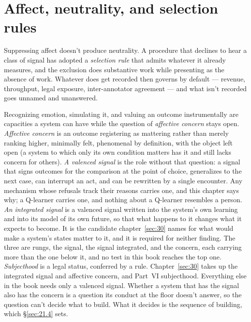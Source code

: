 \section{Affect, neutrality, and selection rules}
\label{sec:21.2}
Suppressing affect doesn't produce neutrality. A procedure that declines to hear a class of signal has adopted a \emph{selection rule} that admits whatever it already measures, and the exclusion does substantive work while presenting as the absence of work. Whatever does get recorded then governs by default — revenue, throughput, legal exposure, inter-annotator agreement — and what isn't recorded goes unnamed and unanswered.

Recognizing emotion, simulating it, and valuing an outcome instrumentally are capacities a system can have while the question of \emph{affective concern} stays open.
\emph{Affective concern} is an outcome registering as mattering rather than merely ranking higher, minimally felt, phenomenal by definition, with the object left open (a system to which only its own condition matters has it and still lacks concern for others).
\emph{A valenced signal} is the role without that question: a signal that signs outcomes for the comparison at the point of choice, generalizes to the next case, can interrupt an act, and can be rewritten by a single encounter. Any mechanism whose refusals track their reasons carries one, and this chapter says why; a Q-learner carries one, and nothing about a Q-learner resembles a person.
\emph{An integrated signal} is a valenced signal written into the system's own learning and into its model of its own future, so that what happens to it changes what it expects to become. It is the candidate chapter~\ref{sec:30} names for what would make a system's states matter to it, and it is required for neither finding. The three are rungs, the signal, the signal integrated, and the concern, each carrying more than the one below it, and no test in this book reaches the top one.
\emph{Subjecthood} is a legal status, conferred by a rule. Chapter~\ref{sec:30} takes up the integrated signal and affective concern, and Part~VI subjecthood. Everything else in the book needs only a valenced signal. Whether a system that has the signal also has the concern is a question its conduct at the floor doesn't answer, so the question can't decide what to build. What it decides is the sequence of building, which \S\ref{sec:21.4} sets.
